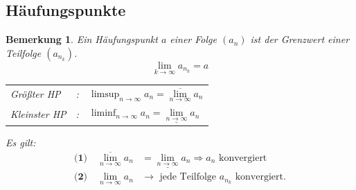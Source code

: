 \documentclass[12pt,a4paper]{report}%
\newtheorem{bem}{Bemerkung}[section]
\numberwithin{equation}{section}
\numberwithin{equation}{subsection}
\begin{document}
  \subsection{Häufungspunkte}
  \begin{bem}
    Ein Häufungspunkt $a$ einer Folge $(a_n)$ ist der Grenzwert einer Teilfolge $(a_{n_k})$.
    \begin{equation*}
      \lim\limits_{k \rightarrow \infty} a_{n_k} = a
    \end{equation*}
    \begin{tabular}{l c l}
      Größter HP&: & $\limsup_{n \rightarrow \infty} a_n = \overline{\lim\limits_{n \rightarrow \infty}} a_n$ \\
      Kleinster HP&: & $\liminf_{n \rightarrow \infty} a_n = \underline{\lim\limits_{n \rightarrow \infty}} a_n$
    \end{tabular} \newline
    Es gilt:
    \begin{align*}
    \textbf{(1)}\quad \overline{\lim\limits_{n \rightarrow \infty}} a_n &= \underline{\lim\limits_{n \rightarrow \infty}} a_n \Rightarrow a_n \text{ konvergiert} \\
    \textbf{(2)}\quad \lim\limits_{n \rightarrow \infty} a_n  &\rightarrow \text{ jede Teilfolge } a_{n_k} \text{ konvergiert.}
    \end{align*}
  \end{bem}  
  
\end{document}
